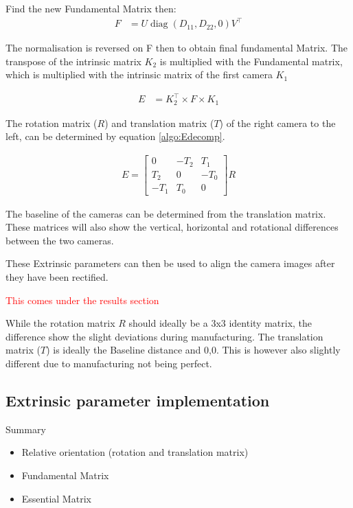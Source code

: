 \documentclass{article}
\newcommand{\rf}[1]{\textcolor{red}{#1}}
\begin{document}
Find the new Fundamental Matrix then:
\begin{align}
    F &= U \operatorname{diag}\left(D_{11}, D_{22}, 0\right) V^{\top}
\end{align}

The normalisation is reversed on F then to obtain final fundamental Matrix.  The transpose of the intrinsic matrix $K_2$ is multiplied with the Fundamental matrix, which is multiplied with the intrinsic matrix of the first camera $K_1$

\begin{align}
    E &= K_2^{\top} \times F \times K_1
\end{align}

The rotation matrix ($R$) and translation matrix ($T$) of the right camera to the left, can be determined by equation \ref{algo:Edecomp}.

\begin{align}
E=\left[\begin{array}{ccc}
0 & -T_{2} & T_{1} \\
T_{2} & 0 & -T_{0} \\
-T_{1} & T_{0} & 0
\end{array}\right] R \label{algo:Edecomp}
\end{align}

The baseline of the cameras can be determined from the translation matrix.  These matrices will also show the vertical, horizontal and rotational differences between the two cameras.

These Extrinsic parameters can then be used to align the camera images after they have been rectified.

\rf{This comes under the results section}

While the rotation matrix $R$ should ideally be a 3x3 identity matrix, the difference show the slight deviations during manufacturing.  The translation matrix ($T$) is ideally the Baseline distance and 0,0.  This is however also slightly different due to manufacturing not being perfect.








\subsection{Extrinsic parameter implementation}

Summary
\begin{itemize}
    \item Relative orientation (rotation and translation matrix)
    \item Fundamental Matrix
    \item Essential Matrix
\end{itemize}
\end{document}
